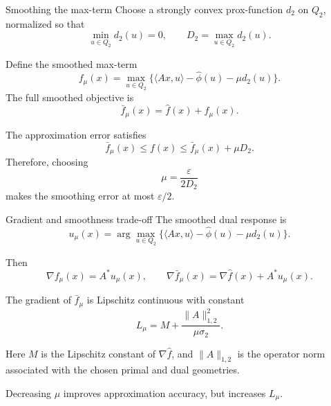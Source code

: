 \documentclass[aspectratio=169]{beamer}
\begin{document}
\begin{frame}{Smoothing the max-term}
  Choose a strongly convex prox-function $d_2$ on $Q_2$, normalized so that
  \[
      \min_{u\in Q_2}d_2(u)=0,
      \qquad
      D_2=\max_{u\in Q_2}d_2(u).
  \]

  Define the smoothed max-term
  \[
      f_\mu(x)=\max_{u\in Q_2}
      \{\langle Ax,u\rangle-\hat\phi(u)-\mu d_2(u)\}.
  \]
  The full smoothed objective is
  \[
      \bar f_\mu(x)=\hat f(x)+f_\mu(x).
  \]

  The approximation error satisfies
  \[
      \bar f_\mu(x)\le f(x)\le \bar f_\mu(x)+\mu D_2.
  \]
  Therefore, choosing
  \[
      \mu=\frac{\varepsilon}{2D_2}
  \]
  makes the smoothing error at most $\varepsilon/2$.
\end{frame}

\begin{frame}{Gradient and smoothness trade-off}
  The smoothed dual response is
  \[
      u_\mu(x)=\arg\max_{u\in Q_2}
      \{\langle Ax,u\rangle-\hat\phi(u)-\mu d_2(u)\}.
  \]

  Then
  \[
      \nabla f_\mu(x)=A^*u_\mu(x),
      \qquad
      \nabla\bar f_\mu(x)=\nabla\hat f(x)+A^*u_\mu(x).
  \]

  The gradient of $\bar f_\mu$ is Lipschitz continuous with constant
  \[
      L_\mu=M+\frac{\|A\|_{1,2}^2}{\mu\sigma_2}.
  \]

  \vspace{0.3em}
  Here $M$ is the Lipschitz constant of $\nabla\hat f$, and $\|A\|_{1,2}$ is the operator norm associated with the chosen primal and dual geometries.

  \vspace{0.3em}
  Decreasing $\mu$ improves approximation accuracy, but increases $L_\mu$.
\end{frame}
\end{document}
